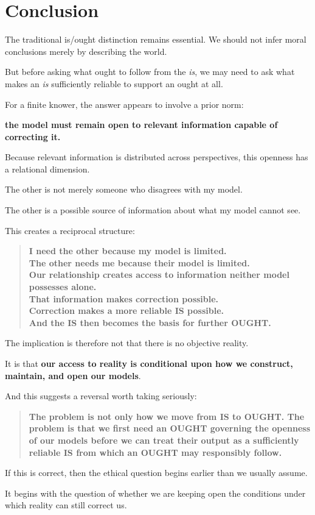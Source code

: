 \documentclass{article}
\begin{document}
\section*{Conclusion}

The traditional is/ought distinction remains essential. We should not infer moral conclusions merely by describing the world.

But before asking what ought to follow from the \textit{is}, we may need to ask what makes an \textit{is} sufficiently reliable to support an ought at all.

For a finite knower, the answer appears to involve a prior norm:

\textbf{the model must remain open to relevant information capable of correcting it.}

Because relevant information is distributed across perspectives, this openness has a relational dimension.

The other is not merely someone who disagrees with my model.

The other is a possible source of information about what my model cannot see.

This creates a reciprocal structure:

\begin{quote}
    \textbf{I need the other because my model is limited. \\
    The other needs me because their model is limited. \\
    Our relationship creates access to information neither model possesses alone. \\
    That information makes correction possible. \\
    Correction makes a more reliable IS possible. \\
    And the IS then becomes the basis for further OUGHT.}
\end{quote}

The implication is therefore not that there is no objective reality.

It is that \textbf{our access to reality is conditional upon how we construct, maintain, and open our models}.

And this suggests a reversal worth taking seriously:

\begin{quote}
    \textbf{The problem is not only how we move from IS to OUGHT. The problem is that we first need an OUGHT governing the openness of our models before we can treat their output as a sufficiently reliable IS from which an OUGHT may responsibly follow.}
\end{quote}

If this is correct, then the ethical question begins earlier than we usually assume.

It begins with the question of whether we are keeping open the conditions under which reality can still correct us.
\end{document}
